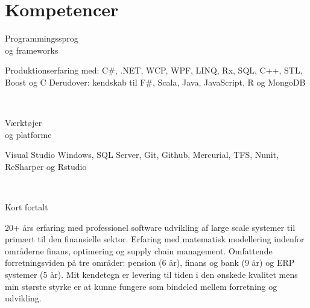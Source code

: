 \documentclass[10pt, a4paper]{article}
\begin{document}
\section{Kompetencer}
\begin{Row}%
  \begin{Cell}{1}
    Programmingssprog \\[1ex]
    og frameworks
  \end{Cell}
  \begin{Cell}{3}
    Produktionserfaring med: C\#, .NET, WCP, WPF, LINQ, Rx, SQL, C++, STL, Boost og C Derudover: kendskab til F\#, Scala, Java, JavaScript, R og MongoDB %
  \end{Cell}
\end{Row}
\\[0.5cm]
\begin{Row}%
  \begin{Cell}{1}
    Værktøjer \\[1ex]
    og platforme
  \end{Cell}
  \begin{Cell}{3}
    Visual Studio Windows, SQL Server, Git, Github, Mercurial, TFS, Nunit, ReSharper og Rstudio
  \end{Cell}
\end{Row}
\\[0.5cm]
\begin{Row}%
  \begin{Cell}{1}
    Kort fortalt
  \end{Cell}
  \begin{Cell}{3}
    20+ års erfaring med professionel software udvikling af large scale systemer til primært til den finansielle sektor. Erfaring med matematisk modellering indenfor områderne finans, optimering og supply chain management. Omfattende forretningsviden på tre områder: pension (6 år), finans og bank (9 år) og ERP systemer (5 år). Mit kendetegn er levering til tiden i den ønskede kvalitet mens min største styrke er at kunne fungere som bindeled mellem forretning og udvikling.
  \end{Cell}
\end{Row}

\end{document}
